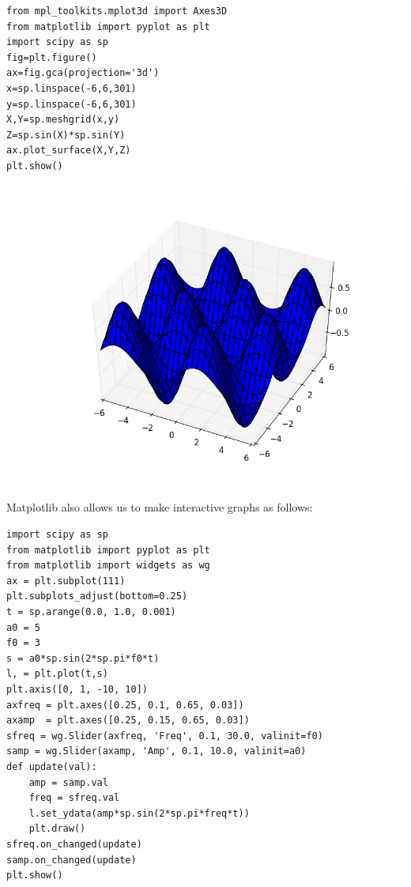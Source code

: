 \begin{lstlisting}
from mpl_toolkits.mplot3d import Axes3D
from matplotlib import pyplot as plt
import scipy as sp
fig=plt.figure()
ax=fig.gca(projection='3d')
x=sp.linspace(-6,6,301)
y=sp.linspace(-6,6,301)
X,Y=sp.meshgrid(x,y)
Z=sp.sin(X)*sp.sin(Y)
ax.plot_surface(X,Y,Z)
plt.show()
\end{lstlisting}

\includegraphics[width=\textwidth]{3dplot.png}

Matplotlib also allows us to make interactive graphs as follows:


\begin{lstlisting}
import scipy as sp
from matplotlib import pyplot as plt
from matplotlib import widgets as wg
ax = plt.subplot(111)
plt.subplots_adjust(bottom=0.25)
t = sp.arange(0.0, 1.0, 0.001)
a0 = 5
f0 = 3
s = a0*sp.sin(2*sp.pi*f0*t)
l, = plt.plot(t,s)
plt.axis([0, 1, -10, 10])
axfreq = plt.axes([0.25, 0.1, 0.65, 0.03])
axamp  = plt.axes([0.25, 0.15, 0.65, 0.03])
sfreq = wg.Slider(axfreq, 'Freq', 0.1, 30.0, valinit=f0)
samp = wg.Slider(axamp, 'Amp', 0.1, 10.0, valinit=a0)
def update(val):
    amp = samp.val
    freq = sfreq.val
    l.set_ydata(amp*sp.sin(2*sp.pi*freq*t))
    plt.draw()
sfreq.on_changed(update)
samp.on_changed(update)
plt.show()
\end{lstlisting}

